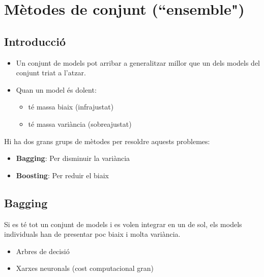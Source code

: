 \chapter{Mètodes de conjunt (``ensemble")}
\section{Introducció}

\begin{itemize}
	\item Un conjunt de models pot arribar a generalitzar millor que un dels models del conjunt triat a l'atzar.
	\item Quan un model és dolent:
	\begin{itemize}
		\item té massa biaix (infrajustat)
		\item té massa variància (sobreajustat)
	\end{itemize}
\end{itemize}

Hi ha dos grans grups de mètodes per resoldre aquests problemes:
\begin{itemize}
	\item \textbf{Bagging}: Per disminuir la variància
	\item \textbf{Boosting}: Per reduir el biaix
\end{itemize}

\section{Bagging}
Si es té tot un conjunt de models i es volen integrar en un de sol, els models individuals han de presentar poc biaix i molta variància. 

\begin{itemize}
	\item Arbres de decisió
	\item Xarxes neuronals (cost computacional gran)
\end{itemize}



